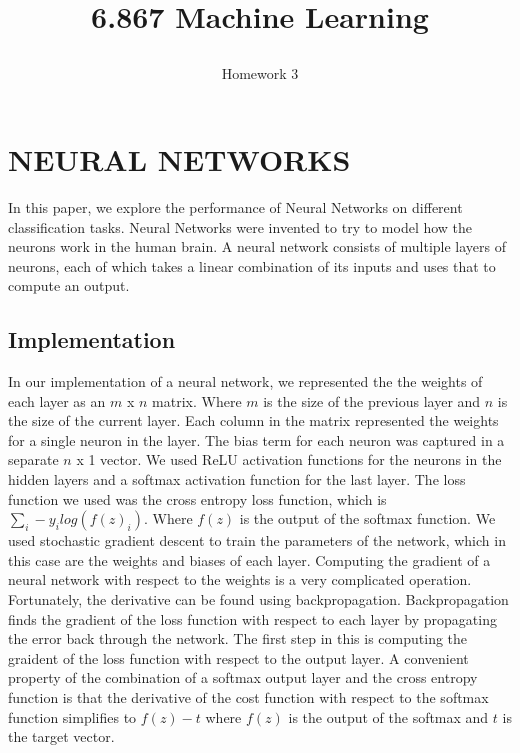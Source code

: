 \documentclass[10pt,twoside]{article}
\begin{document}
\title{6.867 Machine Learning  \subtitle{Homework 3} }

\maketitle


\section{\uppercase{Neural Networks}}

\noindent In this paper, we explore the performance of Neural Networks on different classification tasks. Neural Networks were invented to try to model how the neurons work in the human brain. A neural network consists of multiple layers of neurons, each of which takes a linear combination of its inputs and uses that to compute an output. 


\subsection{Implementation}

In our implementation of a neural network, we represented the the weights of each layer as an $m$ x $n$ matrix. Where $m$ is the size of the previous layer and $n$ is the size of the current layer. Each column in the matrix represented the weights for a single neuron in the layer. The bias term for each neuron was captured in a separate $n$ x 1 vector. We used ReLU activation functions for the neurons in the hidden layers and a softmax activation function for the last layer. The loss function we used was the cross entropy loss function, which is $\sum _i -y_i log(f(z)_i) $. Where $f(z)$ is the output of the softmax function. We used stochastic gradient descent to train the parameters of the network, which in this case are the weights and biases of each layer. Computing the gradient of a neural network with respect to the weights is a very complicated operation. Fortunately, the derivative can be found using backpropagation. Backpropagation finds the gradient of the loss function with respect to each layer by propagating the error back through the network. The first step in this is computing the graident of the loss function with respect to the output layer. A convenient property of the combination of a softmax output layer and the cross entropy function is that the derivative of the cost function with respect to the softmax function simplifies to $f(z)-t$ where $f(z)$ is the output of the softmax and $t$ is the target vector. 
\end{document}
